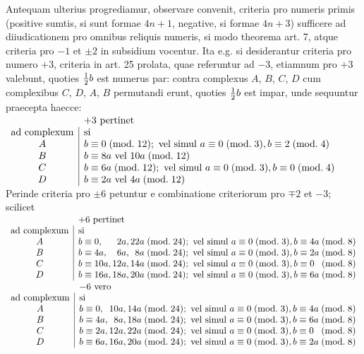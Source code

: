 \documentclass[twoside,12pt, showframe]{memoir}
\renewcommand{\pmod}[1]{\;(\textrm{mod.}\;#1)}
\let\oldfrac\frac
\def\frac#1#2{\mathchoice{\tfrac{#1}{#2}}{\oldfrac{#1}{#2}}{\genfrac{}{}{}{2}{#1}{#2\mathstrut}}{\genfrac{}{}{}{3}{#1}{#2\mathstrut}}}
\begin{document}
Antequam ulterius progrediamur, observare convenit, criteria pro numeris primis (positive sumtis, si sunt formae \(4 n+1\), negative, si formae \(4 n+3\)) sufficere ad diiudicationem pro omnibus reliquis numeris, si modo theorema art. 7, atque criteria pro \(-1\) et \(\pm 2\) in subsidium vocentur. Ita e.g. si desiderantur criteria pro numero \(+3\), criteria in art. 25 prolata, quae referuntur ad \(-3\), etiamnum pro \(+3\) valebunt, quoties \(\frac{1}{2} b\) est numerus par: contra complexus \(A\), \(B\), \(C\), \(D\) cum complexibus \(C\), \(D\), \(A\), \(B\) permutandi erunt, quoties \(\frac{1}{2} b\) est impar, unde sequuntur praecepta haecce:\clearpage\noindent%
\(\begin{array}{c|l}
\multicolumn{1}{c}{}&\multicolumn{1}{l}{+3\text{ pertinet}}\\
\text{ad complexum}&\text{si}\\
A & b \equiv 0\pmod{12}; \text{ vel simul } a \equiv 0\pmod{3}, b \equiv 2\pmod{4} \\
B & b \equiv 8 a \text{ vel } 10 a\pmod{12} \\
C & b \equiv 6 a\pmod{12}; \text{ vel simul } a \equiv 0\pmod{3}, b \equiv 0\pmod{4} \\
D & b \equiv 2 a \text{ vel } 4 a\pmod{12}
\end{array}\)\\

Perinde criteria pro \(\pm 6\) petuntur e combinatione criteriorum pro \(\mp 2\) et \(-3\); scilicet\\
\(\begin{array}{c|l}
\multicolumn{1}{c}{}&\multicolumn{1}{l}{+6\text{ pertinet}}\\
\text{ad complexum}&\text{si}\\
A & b \equiv 0, \phantom{00a}2a, 22a \pmod{24}; \text{ vel simul } a \equiv 0 \pmod{3}, b \equiv 4a \pmod{8} \\
B & b \equiv 4a, \phantom{00}6a, \phantom{0}8a \pmod{24}; \text{ vel simul } a \equiv 0 \pmod{3}, b \equiv 2a \pmod{8} \\
C & b \equiv 10a, 12a, 14a \pmod{24}; \text{ vel simul } a \equiv 0 \pmod{3}, b \equiv 0\phantom{a} \pmod{8} \\
D & b \equiv 16a, 18a, 20a \pmod{24}; \text{ vel simul } a \equiv 0 \pmod{3}, b \equiv 6a \pmod{8}
\end{array}\)\\
\(\begin{array}{c|l}
\multicolumn{1}{c}{}&\multicolumn{1}{l}{-6\text{ vero}}\\
\text{ad complexum}&\text{si}\\
A & b \equiv 0,\phantom{a} 10a, 14a \pmod{24}; \text{ vel simul } a \equiv 0 \pmod{3}, b \equiv 4a \pmod{8} \\
B & b \equiv 4a, \phantom{0}8a, 18a \pmod{24}; \text{ vel simul } a \equiv 0 \pmod{3}, b \equiv 6a \pmod{8} \\
C & b \equiv 2a, 12a, 22a \pmod{24}; \text{ vel simul } a \equiv 0 \pmod{3}, b \equiv 0\phantom{a} \pmod{8} \\
D & b \equiv 6a, 16a, 20a \pmod{24}; \text{ vel simul } a \equiv 0 \pmod{3}, b \equiv 2a \pmod{8}
\end{array}\)\\
 
\end{document}
